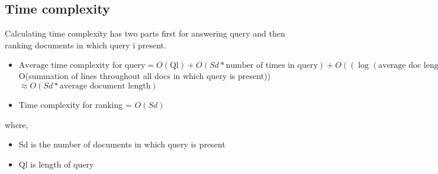 \documentclass[12pt]{article}
\begin{document}
\subsection{Time complexity} 
Calculating time complexity has two parts first for answering query and then ranking documents in which query i present.

\begin{itemize}
\item[]$\text{Average time complexity for query} = O(\text{Ql}) + O(Sd*\text{number of times in query}) + O((\log(\text{average doc length}))*Sd) + O(Sd*Ql* \text{average document length}+$ O(summation of lines throughout all docs in which query is present))\\
$\approx O(Sd*\text{average document length})$

\item[] Time complexity for ranking = $O(Sd)$

\end{itemize}

where,
\begin{itemize}
\item[]Sd is the number of documents in which query is present
\item[]Ql is length of query
\end{itemize}



 
 
\end{document}
